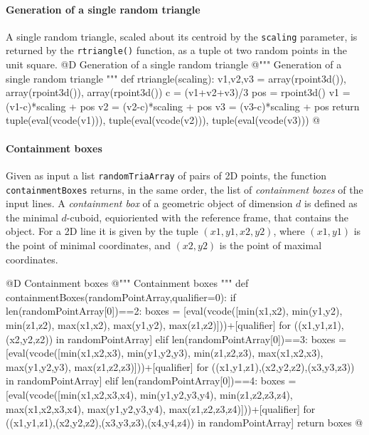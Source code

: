 \documentclass[11pt,oneside]{article}    %
\begin{document}
\paragraph{Generation of a single random triangle}
A single random triangle, scaled about its centroid by the \texttt{scaling} parameter, is returned by the \texttt{rtriangle()} function, as a tuple ot two random points in the unit square.
@D Generation of a single random triangle
@{""" Generation of a single random triangle """
def rtriangle(scaling):
    v1,v2,v3 = array(rpoint3d()), array(rpoint3d()), array(rpoint3d())
    c = (v1+v2+v3)/3
    pos = rpoint3d()
    v1 = (v1-c)*scaling + pos
    v2 = (v2-c)*scaling + pos
    v3 = (v3-c)*scaling + pos
    return tuple(eval(vcode(v1))), tuple(eval(vcode(v2))), tuple(eval(vcode(v3)))
@}
    

\paragraph{Containment boxes}

Given as input a list \texttt{randomTriaArray} of pairs of 2D points, the function \texttt{containmentBoxes} returns, in the same order, the list of \emph{containment boxes} of the input lines. A \emph{containment box} of a geometric object of dimension $d$ is defined as the minimal $d$-cuboid, equioriented with the reference frame, that contains the object. For a 2D line it is given by the tuple $(x1,y1,x2,y2)$, where $(x1,y1)$ is the point of minimal coordinates, and $(x2,y2)$ is the point of maximal  coordinates.

@D Containment boxes
@{""" Containment boxes """
def containmentBoxes(randomPointArray,qualifier=0):
    if len(randomPointArray[0])==2:
        boxes = [eval(vcode([min(x1,x2), min(y1,y2), min(z1,z2), 
                             max(x1,x2), max(y1,y2), max(z1,z2)]))+[qualifier]
                for ((x1,y1,z1),(x2,y2,z2)) in randomPointArray]
    elif len(randomPointArray[0])==3:
        boxes = [eval(vcode([min(x1,x2,x3), min(y1,y2,y3), min(z1,z2,z3), 
                             max(x1,x2,x3), max(y1,y2,y3), max(z1,z2,z3)]))+[qualifier]
                for ((x1,y1,z1),(x2,y2,z2),(x3,y3,z3)) in randomPointArray]
    elif len(randomPointArray[0])==4:
        boxes = [eval(vcode([min(x1,x2,x3,x4), min(y1,y2,y3,y4), min(z1,z2,z3,z4), 
                             max(x1,x2,x3,x4), max(y1,y2,y3,y4), max(z1,z2,z3,z4)]))+[qualifier]
                for ((x1,y1,z1),(x2,y2,z2),(x3,y3,z3),(x4,y4,z4)) in randomPointArray]
    return boxes
@}
\end{document}
